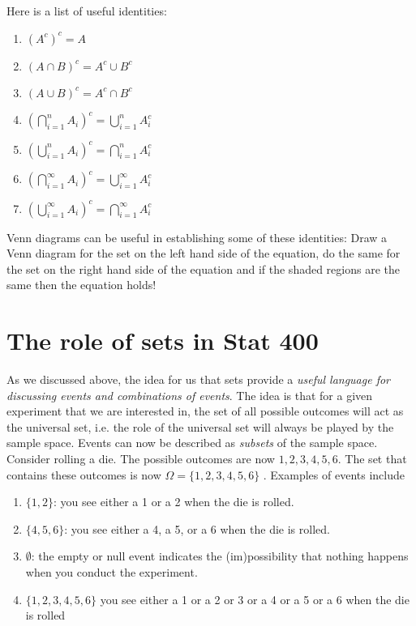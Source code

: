 \begin{appendices}
		 
		 Here is a list of useful identities: \begin{enumerate}
		 	\item  $(A^c)^c=A$
		 	\item $(A\cap B)^c = A^c \cup B^c$
		 	\item $(A\cup B)^c = A^c \cap B^c$
		 	\item $(\bigcap_{i=1}^n A_i)^c = \bigcup_{i=1}^n A_i^c$
		 	\item $(\bigcup_{i=1}^n A_i )^c= \bigcap_{i=1}^n A_i^c$
		 	\item $(\bigcap_{i=1}^\infty A_i)^c = \bigcup_{i=1}^\infty A_i^c$
		 	\item $(\bigcup_{i=1}^\infty A_i)^c = \bigcap_{i=1}^\infty A_i^c$
		 \end{enumerate} 
		
		Venn diagrams can be useful in establishing some of these identities: Draw a Venn diagram for the set on the left hand side of the equation, do the same for the set on the right hand side of the equation and if the shaded regions are the same then the equation holds! 
		 
		
		 \section{The role of sets in Stat 400}
		 
		 As we discussed above, the idea for us that sets provide a \textit{useful language for discussing events and combinations of events}. The idea is that  for a given experiment that we are interested in, the set of all possible outcomes will act as the universal set, i.e. the role of the universal set will always be played by the sample space. Events can now be described as \textit{subsets} of the sample space. \\
		 
		 
		 Consider rolling a die. The possible outcomes are now $1, 2,3,4,5,6$. The set that contains these outcomes is now $\Omega=\{ 1,2,3,4,5,6 \}$ . Examples of events include \begin{enumerate}
		 		\item $\{1,2\}$: you see either a 1 or a 2 when the die is rolled.
		 		\item $\{4,5,6\}$: you see either a 4, a 5, or a 6 when the die is rolled.
		 		\item $\emptyset$: the empty or null event indicates the (im)possibility that nothing happens when you conduct the experiment.
		 		\item $\{1,2,3,4,5,6\}$ you see either a 1 or a 2 or 3 or a 4 or a 5 or a 6 when the die is rolled
		 		\end{enumerate}
		 

\end{appendices}
